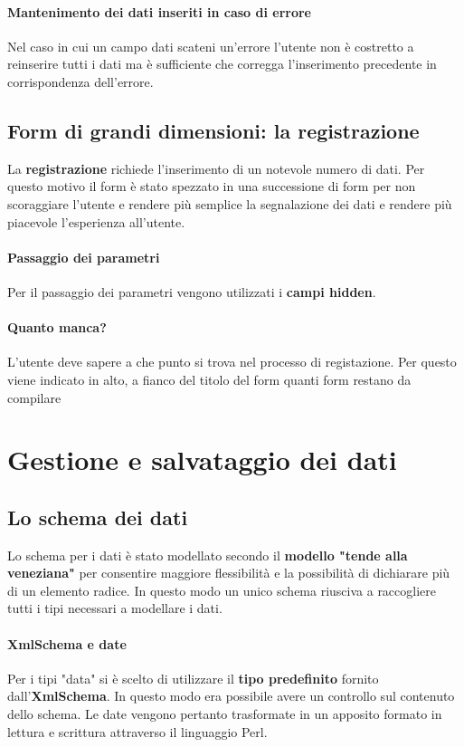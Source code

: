 \documentclass[12pt,a4paper]{article}
\begin{document}
\paragraph{Mantenimento dei dati inseriti in caso di errore} 
Nel caso in cui un campo dati scateni un'errore l'utente non è costretto a reinserire tutti i dati ma è sufficiente che corregga l'inserimento precedente in corrispondenza dell'errore. 
\subsection{Form di grandi dimensioni: la registrazione} 
La \textbf{registrazione} richiede l'inserimento di un notevole numero di dati. Per questo motivo il form è stato spezzato in una successione di form per non scoraggiare l'utente e rendere più semplice la segnalazione dei dati e rendere più piacevole l'esperienza all'utente. 
\paragraph{Passaggio dei parametri} Per il passaggio dei parametri vengono utilizzati i \textbf{campi hidden}. 
\paragraph{Quanto manca?} L'utente deve sapere a che punto si trova nel processo di registazione. Per questo viene indicato in alto, a fianco del titolo del form quanti form restano da compilare
\section{Gestione e salvataggio dei dati}
\subsection{Lo schema dei dati}
Lo schema per i dati è stato modellato secondo il \textbf{modello "tende alla veneziana"} per consentire maggiore flessibilità e la possibilità di dichiarare più di un elemento radice.
In questo modo un unico schema riusciva a raccogliere tutti i tipi necessari a modellare i dati.

\paragraph{XmlSchema e date} Per i tipi "data" si è scelto di utilizzare il \textbf{tipo predefinito} fornito dall'\textbf{XmlSchema}. In questo modo era possibile avere un controllo sul contenuto dello schema. Le date vengono pertanto trasformate in un apposito formato in lettura e scrittura attraverso il linguaggio Perl. 
\end{document}
